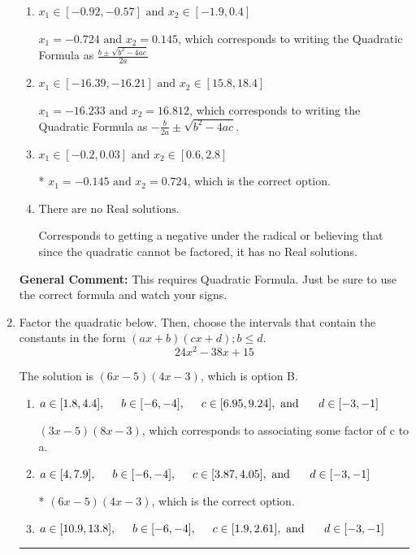 \documentclass{extbook}[14pt]
\newcommand{\litem}[1]{\item #1

\rule{\textwidth}{0.4pt}}
\begin{document}
\begin{enumerate}
{\begin{enumerate}[label=\Alph*.]
 $x_1 = -2.761 \text{ and } x_2 = 13.761$, which corresponds to using the Quadratic Formula with $a=1$
\item \( x_1 \in [-0.92, -0.57] \text{ and } x_2 \in [-1.9, 0.4] \)

 $x_1 = -0.724 \text{ and } x_2 = 0.145$, which corresponds to writing the Quadratic Formula as $\frac{b \pm \sqrt{b^2 - 4ac}}{2a}$
\item \( x_1 \in [-16.39, -16.21] \text{ and } x_2 \in [15.8, 18.4] \)

 $x_1 = -16.233 \text{ and } x_2 = 16.812$, which corresponds to writing the Quadratic Formula as $-\frac{b}{2a} \pm \sqrt{b^2 - 4ac}$.
\item \( x_1 \in [-0.2, 0.03] \text{ and } x_2 \in [0.6, 2.8] \)

* $x_1 = -0.145 \text{ and } x_2 = 0.724$, which is the correct option.
\item \( \text{There are no Real solutions.} \)

Corresponds to getting a negative under the radical or believing that since the quadratic cannot be factored, it has no Real solutions.
\end{enumerate}

\textbf{General Comment:} This requires Quadratic Formula. Just be sure to use the correct formula and watch your signs.
}
\litem{
Factor the quadratic below. Then, choose the intervals that contain the constants in the form $(ax+b)(cx+d); b \leq d.$
\[ 24x^{2} -38 x + 15 \]

The solution is \( (6x -5)(4x -3) \), which is option B.\begin{enumerate}[label=\Alph*.]
\item \( a \in [1.8, 4.4], \hspace*{5mm} b \in [-6, -4], \hspace*{5mm} c \in [6.95, 9.24], \text{ and } \hspace*{5mm} d \in [-3, -1] \)

 $(3x -5)(8x -3)$, which corresponds to associating some factor of c to a.
\item \( a \in [4, 7.9], \hspace*{5mm} b \in [-6, -4], \hspace*{5mm} c \in [3.87, 4.05], \text{ and } \hspace*{5mm} d \in [-3, -1] \)

* $(6x -5)(4x -3)$, which is the correct option.
\item \( a \in [10.9, 13.8], \hspace*{5mm} b \in [-6, -4], \hspace*{5mm} c \in [1.9, 2.61], \text{ and } \hspace*{5mm} d \in [-3, -1] \)


\end{enumerate}}
\end{enumerate}
\end{document}
